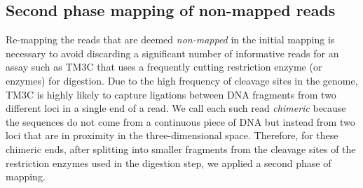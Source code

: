 \subsection*{Second phase mapping of non-mapped reads}
Re-mapping the reads that are deemed \emph{non-mapped} in the initial mapping
is necessary to avoid discarding a significant number of informative reads for
an assay such as TM3C that uses a frequently cutting restriction enzyme (or
enzymes) for digestion. Due to the high frequency of cleavage sites in the
genome, TM3C is highly likely to capture ligations between DNA fragments from two
different loci in a single end of a read. We call each such read
\emph{chimeric} because the sequences do not come from a continuous piece of
DNA but instead from two loci that are in proximity in the three-dimensional
space. Therefore, for these chimeric ends, after splitting into smaller
fragments from the cleavage sites of the restriction enzymes used in the digestion
step, we applied a second phase of mapping.

